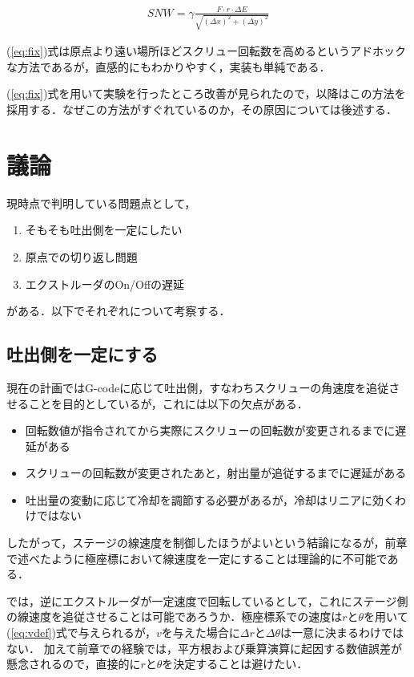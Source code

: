 \documentclass[twocolumn,oneside,a4paper]{article}
\begin{document}
\begin{eqnarray}\label{eq:fix}
  SNW = \gamma \frac{F\cdot r\cdot  \Delta E}{\sqrt{(\Delta x)^2+(\Delta y)^2}}
\end{eqnarray}

(\ref{eq:fix})式は原点より遠い場所ほどスクリュー回転数を高めるというアドホックな方法であるが，直感的にもわかりやすく，実装も単純である．

(\ref{eq:fix})式を用いて実験を行ったところ改善が見られたので，以降はこの方法を採用する．なぜこの方法がすぐれているのか，その原因については後述する．

\section{議論}
現時点で判明している問題点として，

\begin{enumerate}
     \item そもそも吐出側を一定にしたい
     \item 原点での切り返し問題
     \item エクストルーダのOn/Offの遅延
\end{enumerate}

がある．以下でそれぞれについて考察する．

\subsection{吐出側を一定にする}
現在の計画ではG-codeに応じて吐出側，すなわちスクリューの角速度を追従させることを目的としているが，これには以下の欠点がある．

\begin{itemize}
    \item 回転数値が指令されてから実際にスクリューの回転数が変更されるまでに遅延がある
    \item スクリューの回転数が変更されたあと，射出量が追従するまでに遅延がある
     \item 吐出量の変動に応じて冷却を調節する必要があるが，冷却はリニアに効くわけではない
\end{itemize}

したがって，ステージの線速度を制御したほうがよいという結論になるが，前章で述べたように極座標において線速度を一定にすることは理論的に不可能である．

では，逆にエクストルーダが一定速度で回転しているとして，これにステージ側の線速度を追従させることは可能であろうか．極座標系での速度は$r$と$\theta$を用いて(\ref{eq:vdef})式で与えられるが，$v$を与えた場合に$\Delta r$と$\Delta \theta$は一意に決まるわけではない．
加えて前章での経験では，平方根および乗算演算に起因する数値誤差が懸念されるので，直接的に$r$と$\theta$を決定することは避けたい．
\end{document}
